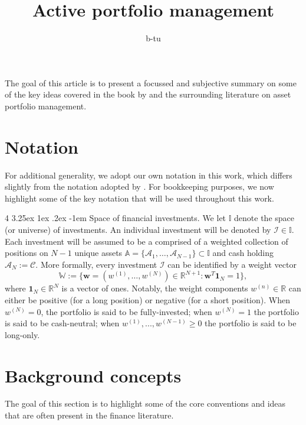 \documentclass[12pt]{article}
\title{Active portfolio management}
\author{
	b-tu
}
\makeatletter
\renewcommand\paragraph{%
	\@startsection{paragraph}
	{4}
	{\z@}
	{3.25ex \@plus1ex \@minus.2ex}
	{-1em}
	{\normalfont\normalsize\bfseries\maybe@addperiod}%
}
\newcommand{\maybe@addperiod}[1]{%
	#1\@addpunct{.}%
}
\makeatother
\begin{document}
\maketitle
The goal of this article is to present a focussed and subjective summary on some of the key ideas covered in the book by \cite{grinold1999} and the surrounding literature on asset portfolio management.
\section{Notation}
For additional generality, we adopt our own notation in this work, which differs slightly from the notation adopted by \cite{grinold1999}. For bookkeeping purposes, we now highlight some of the key notation that will be used throughout this work.

\paragraph{Space of financial investments.} We let $\mathbb{I}$ denote the space (or universe) of investments. An individual investment will be denoted by $\mathcal{I} \in \mathbb{I}$. Each investment will be assumed to be a comprised of a weighted collection of positions on $N-1$ unique assets $\mathbb{A} = \{\mathcal{A}_1, \dots, \mathcal{A}_{N-1}\} \subset \mathbb{I}$ and cash holding $\mathcal{A}_N := \mathcal{C}$. More formally, every investment $\mathcal{I}$ can be identified by a weight vector 
\begin{equation}
	\mathbb{W} := \{\mathbf{w} = (w^{(1)},\dots, w^{(N)}) \in \mathbb{R}^{N+1}: \mathbf{w}^T \mathbf{1}_{N} = 1\},
\end{equation}
where $\mathbf{1}_N \in \mathbb{R}^{N}$ is a vector of ones. Notably, the weight components $w^{(n)} \in \mathbb{R}$ can either be positive (for a long position) or negative (for a short position). When $w^{(N)} = 0$, the portfolio is said to be fully-invested; when $w^{(N)} = 1$ the portfolio is said to be cash-neutral; when $w^{(1)},...,w^{(N-1)} \geq 0$ the portfolio is said to be long-only.
\section{Background concepts}
The goal of this section is to highlight some of the core conventions and ideas that are often present in the finance literature.
\end{document}
